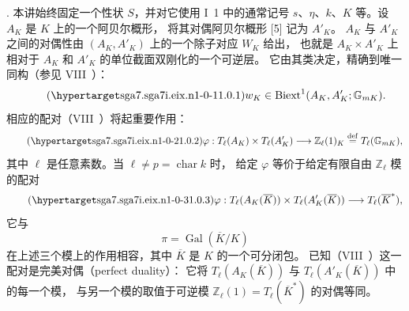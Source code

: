 \medskip
\noindent
{}. 本讲始终固定一个性状 $S$，并对它使用 I~1 中的通常记号
$s$、$\eta$、$k$、$K$ 等。设 $A_K$ 是 $K$ 上的一个阿贝尔概形，
将其对偶阿贝尔概形 [5] 记为 $A'_K$。
$A_K$ 与 $A'_K$ 之间的对偶性由 $(A_K,A'_K)$ 上的一个除子对应 $W_K$ 给出，
也就是 $A_K\times A'_K$ 上相对于 $A_K$ 和 $A'_K$ 的单位截面双刚化的一个可逆层。
它由其类决定，精确到唯一同构（参见 VIII~）：
\begin{equation}\tag{\SGARefTarget{sga7.sga7i.eix.n1-0-1}{1.0.1}}
 w_K\in\mathrm{Biext}^1(A_K,A'_K;\mathbb G_{mK}).
\end{equation}
相应的配对（VIII~）将起重要作用：
\begin{equation}\tag{\SGARefTarget{sga7.sga7i.eix.n1-0-2}{1.0.2}}
 \varphi:T_\ell(A_K)\times T_\ell(A'_K)
 \longrightarrow\mathbb Z_\ell(1)_K
 \overset{\mathrm{def}}{=}T_\ell(\mathbb G_{mK}),
\end{equation}
其中 $\ell$ 是任意素数。当 $\ell\ne p=\operatorname{char}k$ 时，
给定 $\varphi$ 等价于给定有限自由 $\mathbb Z_\ell$ 模的配对
\begin{equation}\tag{\SGARefTarget{sga7.sga7i.eix.n1-0-3}{1.0.3}}
 \varphi:T_\ell(A_K(\overline K))\times
 T_\ell(A'_K(\overline K))\longrightarrow T_\ell(\overline K^*),
\end{equation}
它与
\[
 \pi=\operatorname{Gal}(\overline K/K)
\]
在上述三个模上的作用相容，其中 $\overline K$ 是 $K$ 的一个可分闭包。
已知（VIII~）这一配对是完美对偶（perfect duality）：
它将 $T_\ell(A_K(\overline K))$ 与 $T_\ell(A'_K(\overline K))$ 中的每一个模，
与另一个模的取值于可逆模 $\mathbb Z_\ell(1)=T_\ell(\overline K^*)$ 的对偶等同。

